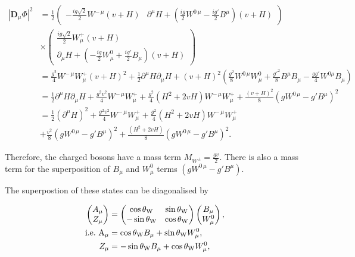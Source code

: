 \documentclass{article}
\begin{document}
\begin{equation}
\begin{split}
|\bm{D}_\mu\Phi|^2 & = \frac{1}{2}\left(\begin{matrix}
-\frac{ig\sqrt{2}}{2}W^{-\,\mu} (v+H) & 
\partial^\mu H + \left(\frac{ig}{2}W^{0\,\mu}  - \frac{ig'}{2}B^\mu\right)(v+H)
\end{matrix}\right)\\
&\times\left(\begin{matrix}
\frac{ig\sqrt{2}}{2}W^{+}_\mu (v+H)\\
\partial_\mu H + \left(-\frac{ig}{2}W^{0}_\mu  + \frac{ig'}{2}B_\mu\right)(v+H)
\end{matrix}\right) \\
& = \frac{g^2}{4}W^{-\,\mu}W^{+}_\mu(v+H)^2 + \frac{1}{2}\partial^\mu H \partial_\mu H + (v+H)^2 \left( \frac{g^2}{8}W^{0\,\mu}W^{0}_\mu + \frac{g'^2}{8}B^\mu B_\mu - \frac{gg'}{4}W^{0\mu}B_\mu \right) \\
& = \frac{1}{2}\partial^\mu H \partial_\mu H + \frac{g^2v^2}{4}W^{-\,\mu}W^{+}_\mu + \frac{g^2}{4}(H^2 + 2vH)W^{-\,\mu}W^{+}_\mu  + \frac{(v+H)^2}{8}(gW^{0\,\mu} - g' B^\mu)^2 \\
& = \frac{1}{2}(\partial^\mu H)^2 + \frac{g^2v^2}{4}W^{-\,\mu}W^{+}_\mu + \frac{g^2}{4}(H^2 + 2vH)W^{-\,\mu}W^{+}_\mu \\
& + \frac{v^2}{8}(gW^{0\,\mu} - g' B^\mu)^2 + \frac{(H^2 + 2vH)}{8}(gW^{0\,\mu} - g' B^\mu)^2.
\end{split}
\end{equation}

Therefore, the charged bosons have a mass term $M_{W^{\pm}} = \frac{gv}{2}$. There is also a mass term for the superposition of $B_\mu$ and $W^{0}_\mu$ terms $(gW^{0\,\mu} - g' B^\mu)$.

The superpostion of these states can be diagonalised by

\begin{equation}
\begin{split}
\left( \begin{matrix}A_\mu \\ Z_\mu\end{matrix}\right) & = \left(\begin{matrix} 
\cos\theta_{\rm{W}} & \sin\theta_{\rm{W}} \\
-\sin\theta_{\rm{W}} & \cos\theta_{\rm{W}}
\end{matrix}\right) \left( \begin{matrix}
B_\mu \\ W^{0}_\mu\end{matrix} \right), \\
\rm{i.e.}\,\, A_\mu & = \cos\theta_{\rm{W}} B_\mu + \sin\theta_{\rm{W}}W^{0}_\mu, \\
Z_\mu & = -\sin\theta_{\rm{W}} B_\mu + \cos\theta_{\rm{W}}W^{0}_\mu,
\end{split}
\end{equation}
\end{document}
